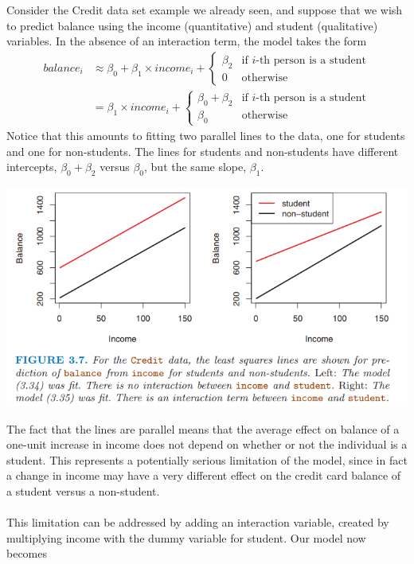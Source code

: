 Consider the Credit data set example we already seen, and suppose that we wish to predict balance using the income (quantitative) and student (qualitative) variables. In the absence of an interaction term, the model takes the form
\[
\begin{split}
    balance_i & \approx \beta_0 + \beta_1 \times income_i + \begin{cases}
    \beta_2 & \text{if $i$-th person is a student}\\
    0 & \text{otherwise}
\end{cases}\\
    & = \beta_1 \times income_i + \begin{cases}
        \beta_0 + \beta_2 & \text{if $i$-th person is a student}\\
        \beta_0 & \text{otherwise}
    \end{cases}
\end{split}
\]
Notice that this amounts to fitting two parallel lines to the data, one for students and one for non-students. The lines for students and non-students have different intercepts, $\beta_0 + \beta_2$ versus $\beta_0$, but the same slope, $\beta_1$.
\begin{center}
    \includegraphics[scale=0.8]{images/creadit card ex. additive.png}
\end{center}
The fact that the lines are parallel means that the average effect on balance of a one-unit increase in income does not depend on whether or not the individual is a student. This represents a potentially serious limitation of the model, since in fact a change in income may have a very different effect on the credit card balance of a student versus a non-student.\\\\
This limitation can be addressed by adding an interaction variable, created by multiplying income with the dummy variable for student. Our model now becomes
